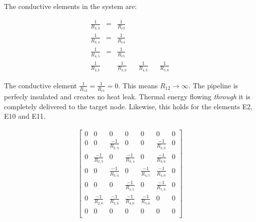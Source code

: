 The conductive elements in the system are:

\begin{equation}
	\begin{aligned}
        \frac{1}{R_{2,3}} & = & \frac{1}{R_{e3}} \\
        \frac{1}{R_{3,4}} & = & \frac{1}{R_{e4}} \\
        \frac{1}{R_{4,5}} & = & \frac{1}{R_{e5}} \\
        \frac{1}{R_{2,6}} & & \frac{1}{R_{3,6}} & & \frac{1}{R_{4,6}} & & \frac{1}{R_{5,6}} 
	\end{aligned}
\end{equation}

The conductive element $\frac{1}{R_{12}} = \frac{1}{R_{e1}} = 0$. This means $R_{12} \rightarrow \infty$. The pipeline is perfecly insulated and creates no heat leak. Thermal energy flowing \emph{through} it is completely delivered to the target node. Likewise, this holds for the elements E2, E10 and E11.

\begin{equation}
	\begin{aligned}
		\begin{bmatrix}
			0 & 0 & 0 & 0 & 0 & 0 & 0\\
            0 & 0 & \frac{-1}{R_{2,3}} & 0 & 0 & \frac{-1}{R_{2,6}} & 0 \\
            0 & \frac{-1}{R_{2,3}} & 0 & \frac{-1}{R_{3,4}} & 0 & \frac{-1}{R_{3,6}} & 0\\
            0 & 0 & \frac{-1}{R_{3,4}} & 0 & \frac{-1}{R_{4,5}} & \frac{-1}{R_{4,6}} & 0\\
            0 & 0 & 0 & \frac{-1}{R_{4,5}} & 0 & \frac{-1}{R_{5,6}} & 0 \\
            0 & \frac{-1}{R_{2,6}} & \frac{-1}{R_{3,6}} & \frac{-1}{R_{4,6}} & \frac{-1}{R_{5,6}} & 0 & 0\\
            0 & 0 & 0 & 0 & 0 & 0 & 0\\
		\end{bmatrix}
	\end{aligned}
\end{equation}

